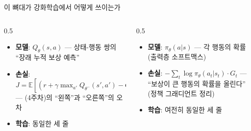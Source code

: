 \begin{frame}{이 뼈대가 강화학습에서 어떻게 쓰이는가}
  \begin{columns}[T]
    \begin{column}{0.5\textwidth}
      \begin{itemize}
        \item \textbf{모델}: $Q_\theta(s, a)$ --- 상태-행동 쌍의
          ``장래 누적 보상 예측''
        \item \textbf{손실}:
          $J = \mathbb{E}\left[(r + \gamma \max_{a'} Q_{\theta^-}(s', a')
          - Q_\theta(s, a))^2\right]$ ---
          (4주차)의 ``왼쪽''과 ``오른쪽''의 오차
        \item \textbf{학습}: 동일한 세 줄
      \end{itemize}
    \end{column}
    \begin{column}{0.5\textwidth}
      \begin{itemize}
        \item \textbf{모델}: $\pi_\theta(a|s)$ --- 각 행동의 확률
          (출력층 소프트맥스)
        \item \textbf{손실}:
          $-\sum_t \log \pi_\theta(a_t|s_t)\cdot G_t$ ---
          ``보상이 큰 행동의 확률을 올린다'' (정책 그래디언트 정리)
        \item \textbf{학습}: 여전히 동일한 세 줄
      \end{itemize}
    \end{column}
  \end{columns}
\end{frame}
